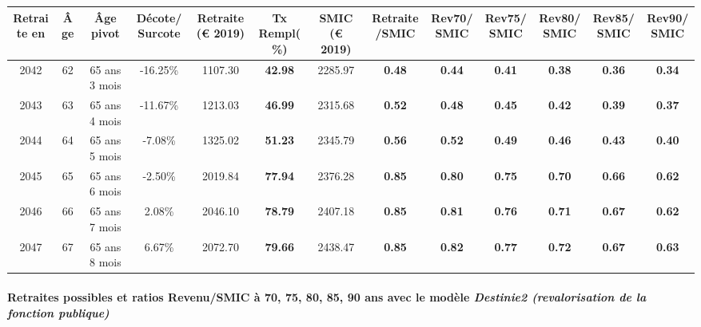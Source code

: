 { \scriptsize \begin{center} 
\begin{tabular}[htb]{|c|c||c|c||c|c||c||c|c|c|c|c|c|} 
\hline 
 Retraite en &  Âge &  Âge pivot &  Décote/Surcote &  Retraite (\euro{} 2019) &  Tx Rempl(\%) &  SMIC (\euro{} 2019) &  Retraite/SMIC &  Rev70/SMIC &  Rev75/SMIC &  Rev80/SMIC &  Rev85/SMIC &  Rev90/SMIC \\ 
\hline \hline 
 2042 &  62 &  65 ans 3 mois &  -16.25\% &  1107.30 &  {\bf 42.98} &  2285.97 &  {\bf {\color{red} 0.48}} &  {\bf {\color{red} 0.44}} &  {\bf {\color{red} 0.41}} &  {\bf {\color{red} 0.38}} &  {\bf {\color{red} 0.36}} &  {\bf {\color{red} 0.34}} \\ 
\hline 
 2043 &  63 &  65 ans 4 mois &  -11.67\% &  1213.03 &  {\bf 46.99} &  2315.68 &  {\bf {\color{red} 0.52}} &  {\bf {\color{red} 0.48}} &  {\bf {\color{red} 0.45}} &  {\bf {\color{red} 0.42}} &  {\bf {\color{red} 0.39}} &  {\bf {\color{red} 0.37}} \\ 
\hline 
 2044 &  64 &  65 ans 5 mois &  -7.08\% &  1325.02 &  {\bf 51.23} &  2345.79 &  {\bf {\color{red} 0.56}} &  {\bf {\color{red} 0.52}} &  {\bf {\color{red} 0.49}} &  {\bf {\color{red} 0.46}} &  {\bf {\color{red} 0.43}} &  {\bf {\color{red} 0.40}} \\ 
\hline 
 2045 &  65 &  65 ans 6 mois &  -2.50\% &  2019.84 &  {\bf 77.94} &  2376.28 &  {\bf {\color{red} 0.85}} &  {\bf {\color{red} 0.80}} &  {\bf {\color{red} 0.75}} &  {\bf {\color{red} 0.70}} &  {\bf {\color{red} 0.66}} &  {\bf {\color{red} 0.62}} \\ 
\hline 
 2046 &  66 &  65 ans 7 mois &  2.08\% &  2046.10 &  {\bf 78.79} &  2407.18 &  {\bf {\color{red} 0.85}} &  {\bf {\color{red} 0.81}} &  {\bf {\color{red} 0.76}} &  {\bf {\color{red} 0.71}} &  {\bf {\color{red} 0.67}} &  {\bf {\color{red} 0.62}} \\ 
\hline 
 2047 &  67 &  65 ans 8 mois &  6.67\% &  2072.70 &  {\bf 79.66} &  2438.47 &  {\bf {\color{red} 0.85}} &  {\bf {\color{red} 0.82}} &  {\bf {\color{red} 0.77}} &  {\bf {\color{red} 0.72}} &  {\bf {\color{red} 0.67}} &  {\bf {\color{red} 0.63}} \\ 
\hline 
\hline 
\end{tabular} 
\end{center} } 
\paragraph{Retraites possibles et ratios Revenu/SMIC à 70, 75, 80, 85, 90 ans avec le modèle \emph{Destinie2 (revalorisation de la fonction publique)}}  
 
